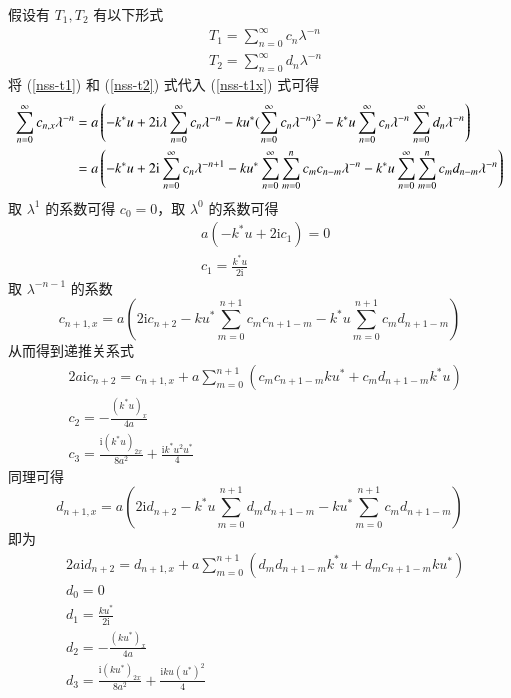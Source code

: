 假设有 $T_{1}, T_{2}$ 有以下形式
\begin{align}
  & T_{1} = \sum_{n=0}^{\infty}c_{n}\lambda^{-n} \label{nss-t1} \\
  & T_{2} = \sum_{n=0}^{\infty}d_{n}\lambda^{-n} \label{nss-t2}
\end{align}
将 (\ref{nss-t1}) 和 (\ref{nss-t2}) 式代入  (\ref{nss-t1x}) 式可得
\begin{align}
  \sum_{n=0}^{\infty}c_{n,x}\lambda^{-n} &= a\left(-k^{*}u + 2\mathrm{i}\lambda\sum_{n=0}^{\infty}c_{n}\lambda^{-n} - ku^{*}(\sum_{n=0}^{\infty}c_{n}\lambda^{-n})^{2} - k^{*}u\sum_{n=0}^{\infty}c_{n}\lambda^{-n}\sum_{n=0}^{\infty}d_{n}\lambda^{-n}\right) \notag\\
  &= a\left(-k^{*}u + 2\mathrm{i}\sum_{n=0}^{\infty}c_{n}\lambda^{-n+1} - ku^{*}\sum_{n=0}^{\infty}\sum_{m=0}^{n}c_{m}c_{n-m}\lambda^{-n} - k^{*}u\sum_{n=0}^{\infty}\sum_{m=0}^{n}c_{m}d_{n-m}\lambda^{-n}\right)
\end{align}
取 $\lambda^{1}$ 的系数可得 $c_{0} = 0$，取 $\lambda^{0}$ 的系数可得
\begin{align}
  & a(-k^{*}u + 2\mathrm{i}c_{1}) = 0 \\
  & c_{1} = \frac{k^{*}u}{2\mathrm{i}}
\end{align}
取 $\lambda^{-n-1}$ 的系数
\begin{equation}
  c_{n+1,x} = a\left(2\mathrm{i}c_{n+2} - ku^{*}\sum_{m=0}^{n+1}c_{m}c_{n+1-m} - k^{*}u\sum_{m=0}^{n+1}c_{m}d_{n+1-m}\right)
\end{equation}
从而得到递推关系式
\begin{align}
  & 2a\mathrm{i}c_{n+2} = c_{n+1,x} + a\sum_{m=0}^{n+1}(c_{m}c_{n+1-m}ku^{*} + c_{m}d_{n+1-m}k^{*}u) \\
  & c_{2} = -\frac{(k^{*}u)_{x}}{4a} \\
  & c_{3} = \frac{\mathrm{i}(k^{*}u)_{2x}}{8a^{2}} + \frac{\mathrm{i}k^{*}u^{2}u^{*}}{4}
\end{align}
同理可得
\begin{equation}
  d_{n+1,x} = a\left(2\mathrm{i}d_{n+2} - k^{*}u\sum_{m=0}^{n+1}d_{m}d_{n+1-m} - ku^{*}\sum_{m=0}^{n+1}c_{m}d_{n+1-m}\right)
\end{equation}
即为
\begin{align}
  & 2a\mathrm{i}d_{n+2} = d_{n+1,x} + a\sum_{m=0}^{n+1}(d_{m}d_{n+1-m}k^{*}u + d_{m}c_{n+1-m}ku^{*}) \\
  & d_{0} = 0 \\
  & d_{1} = \frac{ku^{*}}{2\mathrm{i}} \\
  & d_{2} = -\frac{(ku^{*})_{x}}{4a} \\
  & d_{3} = \frac{\mathrm{i}(ku^{*})_{2x}}{8a^{2}} + \frac{\mathrm{i}ku(u^{*})^{2}}{4}
\end{align}
